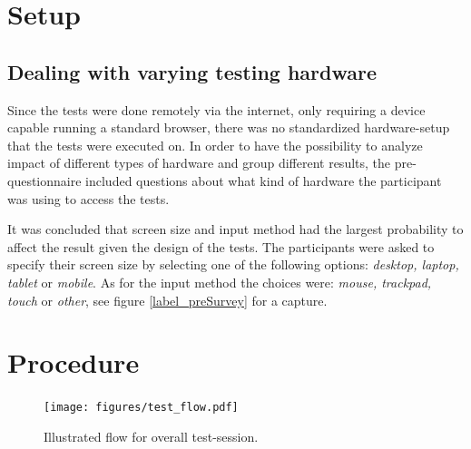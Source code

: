 \documentclass[nofilelist,dvipsnames]{cslthse-msc}
\begin{document}
{%
%
%
%
%
%
%
%

    \section{Setup}


    \subsection{Dealing with varying testing hardware}

      Since the tests were done remotely via the internet, only requiring a
      device capable running a standard browser, there was no standardized
      hardware-setup that the tests were executed on. In order to have the
      possibility to analyze impact of different types of hardware and group
      different results, the pre-questionnaire included questions about what
      kind of hardware the participant was using to access the tests.

      It was concluded that screen size and input method had the largest
      probability to affect the result given the design of the tests.
      The participants were asked to specify their screen size by selecting one
      of the following options: \textit{desktop, laptop, tablet} or
      \textit{mobile}. As for the input method the choices were:
      \textit{mouse, trackpad, touch} or \textit{other}, see figure
      \ref{label_preSurvey} for a capture.

    \section{Procedure}

      \begin{figure}[h!]
        \centering
        \texttt{[image: figures/test\_flow.pdf]}
        \caption{Illustrated flow for overall test-session.}
      \end{figure}

}
\end{document}
